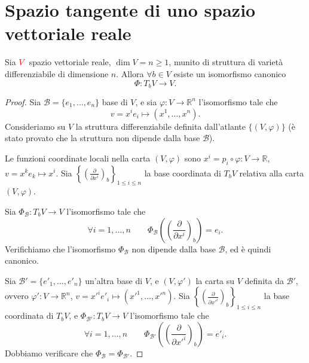    \section{Spazio tangente di uno spazio vettoriale reale}

        \begin{proposizione}
        \mbox{}

        Sia $\textcolor{red}{V}$ spazio vettoriale reale, $\dim V = n \geq 1$, munito di struttura di varietà differenziabile di dimensione $n$. Allora $\forall b \in V$ esiste un isomorfismo canonico
        \[
        \Phi : T_b V \longrightarrow V.
        \]
        \end{proposizione}

        \begin{proof}
        \mbox{}
        
        Sia $\mathcal{B} = \{e_1, \dots, e_n\}$ base di $V$, e sia $\varphi : V \to \mathbb{R}^n$ l'isomorfismo tale che
        \[
        v = x^i e_i \longmapsto (x^1, \dots, x^n).
        \]
        Consideriamo su $V$ la struttura differenziabile definita dall'atlante $\{(V, \varphi)\}$ \textcolor{blu}{(è stato provato che la struttura non dipende dalla base $\mathcal{B}$)}.

        Le funzioni coordinate locali nella carta $(V, \varphi)$ sono $x^i = p_i \circ \varphi : V \to \mathbb{R}$, $v = x^k e_k \longmapsto x^i$.
        Sia $\left\{ \left( \frac{\partial}{\partial x^i} \right)_b \right\}_{1 \leq i \leq n}$ la base coordinata di $T_b V$ relativa alla carta $(V, \varphi)$.

        Sia $\Phi_{\mathcal{B}} : T_b V \to V$ l'isomorfismo tale che
        \[
        \forall i = 1, \dots, n \qquad \Phi_{\mathcal{B}} \left( \left( \frac{\partial}{\partial x^i} \right)_b \right) = e_i.
        \]
        Verifichiamo che l'isomorfismo $\Phi_{\mathcal{B}}$ non dipende dalla base $\mathcal{B}$, ed è quindi canonico.

        Sia $\mathcal{B}' = \{e'_1, \dots, e'_n\}$ un'altra base di $V$, e $(V, \varphi')$ la carta su $V$ definita da $\mathcal{B}'$, ovvero $\varphi' : V \to \mathbb{R}^n$, $v = x'^i e'_i \longmapsto (x'^1, \dots, x'^n)$.
        Sia $\left\{ \left( \frac{\partial}{\partial x'^i} \right)_b \right\}_{1 \leq i \leq n}$ la base coordinata di $T_b V$, e $\Phi_{\mathcal{B}'} : T_b V \to V$ l'isomorfismo tale che
        \[
        \forall i = 1, \dots, n \qquad \Phi_{\mathcal{B}'} \left( \left( \frac{\partial}{\partial x'^i} \right)_b \right) = e'_i.
        \]
        Dobbiamo verificare che $\Phi_{\mathcal{B}} = \Phi_{\mathcal{B}'}$.


\end{proof}
